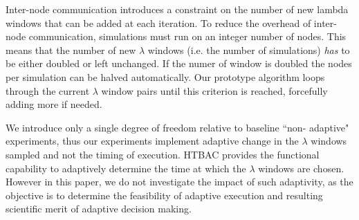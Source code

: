Inter-node communication introduces a constraint on the number of new lambda windows that can be added at each iteration.
To reduce the overhead of inter-node communication, simulations must run on an integer number of nodes. This means that the
number of new $\lambda$ windows (i.e. the number of simulations) \emph{has} to be
either doubled or left unchanged.
If the numer of window is doubled the nodes per simulation can be halved automatically.
Our prototype algorithm loops through the current $\lambda$ window pairs until this criterion is reached, forcefully adding more if needed.




We introduce only a single degree of freedom relative to baseline ``non-
adaptive" experiments, thus our experiments implement adaptive change in the
$\lambda$ windows sampled and not the timing of execution. HTBAC provides the functional
capability to adaptively determine the time at which the $\lambda$ windows are
chosen. However in this paper, we do not investigate the impact of such
adaptivity, as the objective is to determine the feasibility of adaptive
execution and resulting scientific merit of adaptive decision making.



